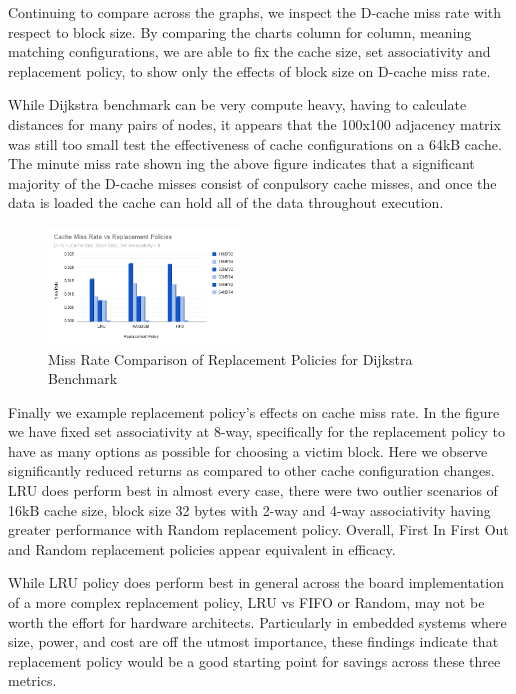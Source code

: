\documentclass[conference]{IEEEtran}
\begin{document}
Continuing to compare across the graphs, we inspect the D-cache miss rate with respect to block size. By comparing the charts column for column, meaning matching configurations, we are able to fix the cache size, set associativity and replacement policy, to show only the effects of block size on D-cache miss rate. 

While Dijkstra benchmark can be very compute heavy, having to calculate distances for many pairs of nodes, it appears that the 100x100 adjacency matrix was still too small test the effectiveness of cache configurations on a 64kB cache. The minute miss rate shown ing the above figure indicates that a significant majority of the D-cache misses consist of conpulsory cache misses, and once the data is loaded the cache can hold all of the data throughout execution.


\begin{figure}[H]
  \centering
  \includegraphics[width=0.45\textwidth]{dijkstraFigures/CacheMissRatevsReplacementPolicies.png}
  \caption{Miss Rate Comparison of Replacement Policies for Dijkstra Benchmark}
  \label{fig:MissRateVsReplPolicy}
\end{figure}

Finally we example replacement policy's effects on cache miss rate. In the figure we have fixed set associativity at 8-way, specifically for the replacement policy to have as many options as possible for choosing a victim block. Here we observe significantly reduced returns as compared to other cache configuration changes. LRU does perform best in almost every case, there were two outlier scenarios of 16kB cache size, block size 32 bytes with 2-way and 4-way associativity having greater performance with Random replacement policy. Overall, First In First Out and Random replacement policies appear equivalent in efficacy. 

While LRU policy does perform best in general across the board implementation of a more complex replacement policy, LRU vs FIFO or Random, may not be worth the effort for hardware architects. Particularly in embedded systems where size, power, and cost are off the utmost importance, these findings indicate that replacement policy would be a good starting point for savings across these three metrics.
\end{document}
